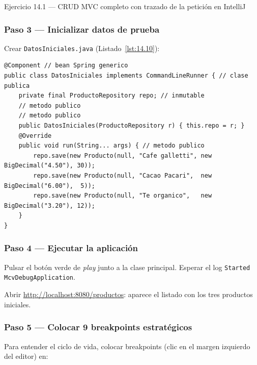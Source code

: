 \begin{cajaejercicio}{Ejercicio 14.1 --- CRUD MVC completo con trazado de la petición en IntelliJ}
\subsubsection*{Paso 3 --- Inicializar datos de prueba}

Crear \texttt{DatosIniciales.java} (Listado~\ref{lst:14.10}):
\begin{lstlisting}[style=java,numbers=none,caption={Ejemplo de Java},label=lst:14.10]
@Component // bean Spring generico
public class DatosIniciales implements CommandLineRunner { // clase publica
    private final ProductoRepository repo; // inmutable
    // metodo publico
    // metodo publico
    public DatosIniciales(ProductoRepository r) { this.repo = r; }
    @Override
    public void run(String... args) { // metodo publico
        repo.save(new Producto(null, "Cafe galletti", new BigDecimal("4.50"), 30));
        repo.save(new Producto(null, "Cacao Pacari",  new BigDecimal("6.00"),  5));
        repo.save(new Producto(null, "Te organico",   new BigDecimal("3.20"), 12));
    }
}
\end{lstlisting}

\subsubsection*{Paso 4 --- Ejecutar la aplicación}

Pulsar el botón verde de \emph{play} junto a la clase principal.
Esperar el log \texttt{Started McvDebugApplication}.

Abrir \url{http://localhost:8080/productos}: aparece el listado con
los tres productos iniciales.

\subsubsection*{Paso 5 --- Colocar 9 breakpoints estratégicos}

Para entender el ciclo de vida, colocar breakpoints (clic en el
margen izquierdo del editor) en:


\end{cajaejercicio}

